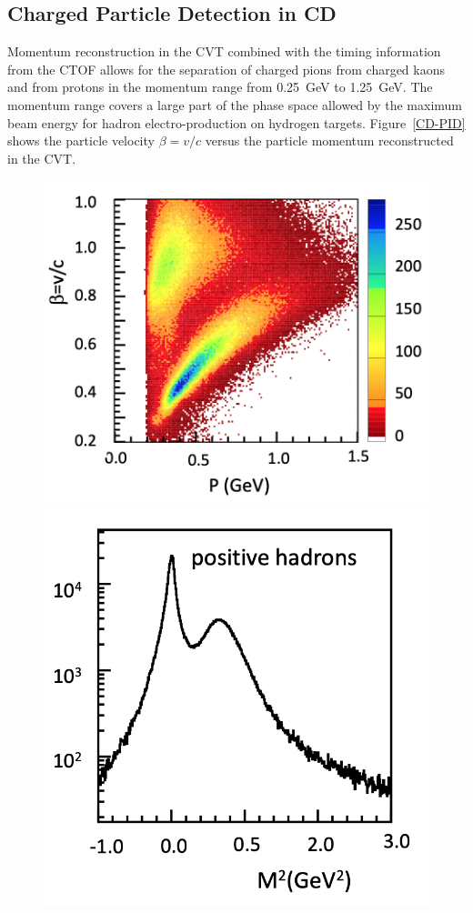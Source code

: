 \documentclass[final,3p,twocolumn]{elsarticle}
\begin{document}
\subsection{Charged Particle Detection in CD} 

Momentum reconstruction in the CVT combined with the timing information from the CTOF allows for the separation 
of charged pions from charged kaons and from protons in the momentum range from 0.25~GeV to 1.25~GeV. The momentum
range covers a large part of the phase space allowed by the maximum beam energy for hadron electro-production 
on hydrogen targets. Figure~\ref{CD-PID} shows the particle velocity $\beta = v/c$ versus the particle momentum 
reconstructed in the CVT.

\begin{figure}[t!]
\centerline{\includegraphics[width=1.0\columnwidth]{CTOF-pid-new.png}}
\centerline{\includegraphics[width=0.8\columnwidth]{CTOF-mass.png}}

\end{figure}
\end{document}
